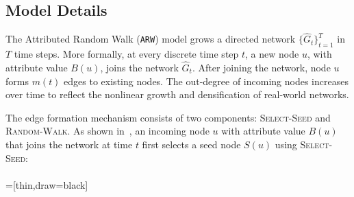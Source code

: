 \subsection{Model Details}
\label{sub:Model Description}
The Attributed Random Walk (\texttt{ARW}) model grows a directed network $\{\hat{G}_t\}^T_{t=1}$
in $T$ time steps.
More formally, at every discrete time step $t$, a
new node $u$, with attribute value $B(u)$, joins the network $\hat{G}_t$.
After joining the network, node $u$ forms $m(t)$ edges to
existing nodes.
The out-degree of incoming nodes increases over time to
reflect the nonlinear growth and densification of real-world networks.

The edge formation mechanism consists of two components: \textsc{Select-Seed} and
\textsc{Random-Walk}. As shown in~, an incoming node $u$ with attribute value $B(u)$ that joins the
network at time $t$ first selects a seed node $S(u)$ using \textsc{Select-Seed}:
\\\\
=[thin,draw=black]


